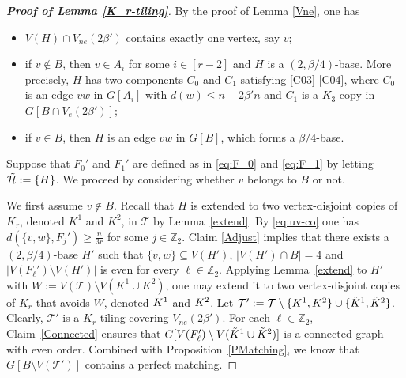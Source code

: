 \documentclass[11pt, a4paper]{article}
\theoremstyle{definition}
\newcommand{\<}{\subseteq}
\begin{document}
\begin{proof}[\bf Proof of Lemma \ref{K_r-tiling}]
By the proof of Lemma \ref{Vne}, one has 
\begin{itemize}
    \item $V(H)\cap V_{ne}(2\beta')$ contains exactly one vertex, say $v$;
    \item if $v\notin B$, then $v\in A_i$ for some $i\in [r-2]$ and $H$ is a $(2,\beta/4)$-base. More precisely, $H$ has two components $C_0$ and $C_1$ satisfying \ref{C03}-\ref{C04}, where $C_0$ is an edge $vw$ in $G[A_i]$ with $d(w)\leq n-2\beta'n$ and $C_1$ is a $K_3$ copy in $G[B\cap V_e(2\beta')]$;
    \item if $v\in B$, then $H$ is an edge  $vw$ in $G[B]$, which forms a $\beta/4$-base.
\end{itemize} 
Suppose that $F_0'$ and $F_1'$ are defined as in \eqref{eq:F_0} and \eqref{eq:F_1} by letting $\Tilde{\mathcal{H}}:=\{H\}$. We proceed by considering whether $v$ belongs to $B$ or not. %

We first assume $v\notin B$. %
Recall that $H$ is extended to two vertex-disjoint copies of $K_r$, denoted $K^1$ and $K^2$, in $\mathcal{T}$ by Lemma~\ref{extend}.  %
By \eqref{eq:uv-co} one has $d(\{v,w\},F_j')\ge \frac{n}{3r}$ for some $j\in \mathbb{Z}_2$. Claim \ref{Adjust} implies that there exists a $(2,\beta/4)$-base $H'$ such that $\{v,w\}\subseteq V(H')$, $|V(H')\cap B|=4$ and $|V(F_\ell')\setminus V(H')|$ is even for every $\ell\in \mathbb{Z}_2.$ Applying Lemma~\ref{extend} to $H'$ with $W:=V(\mathcal{T})\setminus V(K^1\cup K^2)$, one may  extend it to two vertex-disjoint copies of $K_r$ that avoids $W$, denoted  $\Tilde{K}^1$ and $\Tilde{K}^2$. Let $\mathcal{T}':=\mathcal{T}\setminus \{K^1,K^2\}\cup \{\Tilde{K}^1,\Tilde{K}^2\}$. Clearly,  $\mathcal{T}'$ is a $K_r$-tiling covering $V_{ne}(2\beta')$.  %
For each $\ell\in \mathbb{Z}_2$, Claim~\ref{Connected} ensures that $G[V(F_\ell')\setminus V(\Tilde{K}^1\cup \Tilde{K}^2)]$ is a connected graph with even order. %
Combined with Proposition~\ref{PMatching}, we know  that  $G[B\setminus V(\mathcal{T}')]$ contains a perfect matching. 


\end{proof}
\end{document}
